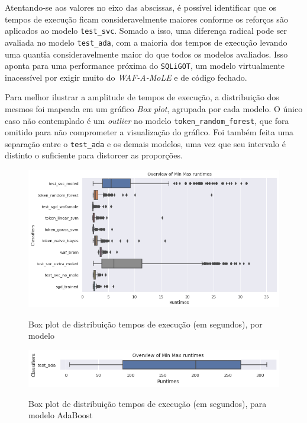 Atentando-se aos valores no eixo das abscissas, é possível identificar que os tempos de execução ficam consideravelmente maiores conforme os reforços são aplicados ao modelo \verb+test_svc+. Somado a isso, uma diferença radical pode ser avaliada no modelo \verb+test_ada+, com a maioria dos tempos de execução levando uma quantia consideravelmente maior do que todos os modelos avaliados. Isso aponta para uma performance próxima do \verb+SQLiGOT+, um modelo virtualmente inacessível por exigir muito do \textit{WAF-A-MoLE} e de código fechado.

Para melhor ilustrar a amplitude de tempos de execução, a distribuição dos mesmos foi mapeada em um gráfico \textit{Box plot}, agrupada por cada modelo. O único caso não contemplado é um \textit{outlier} no modelo \verb+token_random_forest+, que fora omitido para não comprometer a visualização do gráfico. Foi também feita uma separação entre o \verb+test_ada+ e os demais modelos, uma vez que seu intervalo é distinto o suficiente para distorcer as proporções.

\begin{figure}[ht]
    \centering
    \caption{Box plot de distribuição tempos de execução (em segundos), por modelo}
    \includegraphics[width=18cm]{figuras/graficos/min_max_all.png} 
    \label{fig:min-max-all} 
\end{figure}

\begin{figure}[ht]
    \centering
    \caption{Box plot de distribuição tempos de execução (em segundos), para modelo AdaBoost}
    \includegraphics[width=18cm]{figuras/graficos/min_max_ada.png} 
    \label{fig:min-max-ada} 
\end{figure}

